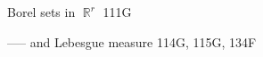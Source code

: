 \indexmedskip






















































































Borel sets in $\BbbR^r$ 111G

----- and Lebesgue measure 114G, 115G, 134F





































